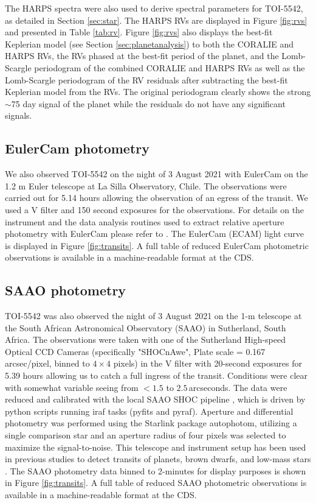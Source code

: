 \documentclass{aa}
\begin{document}
The HARPS spectra were also used to derive spectral parameters for TOI-5542, as detailed in Section \ref{sec:star}. The HARPS RVs are displayed in Figure \ref{fig:rvs} and presented in Table \ref{tab:rv}. Figure \ref{fig:rvs} also displays the best-fit Keplerian model (see Section \ref{sec:planetanalysis}) to both the CORALIE and HARPS RVs, the RVs phased at the best-fit period of the planet, and the Lomb-Scargle periodogram \citep{Lomb1976,Scargle1982} of the combined CORALIE and HARPS RVs as well as the Lomb-Scargle periodogram of the RV residuals after subtracting the best-fit Keplerian model from the RVs. The original periodogram clearly shows the strong $\sim$75 day signal of the planet while the residuals do not have any significant signals.

\subsection{EulerCam photometry}

We also observed TOI-5542 on the night of 3 August 2021 with EulerCam on the 1.2 m Euler telescope at La Silla Observatory, Chile. The observations were carried out for 5.14 hours allowing the observation of an egress of the transit. We used a V filter and 150 second exposures for the observations. For details on the instrument and the data analysis routines used to extract relative aperture photometry with EulerCam please refer to \citet{Lendl2012}. The EulerCam (ECAM) light curve is displayed in Figure \ref{fig:transits}. A full table of reduced EulerCam photometric observations is available in a machine-readable format at the CDS.

\subsection{SAAO photometry}

TOI-5542 was also observed the night of 3 August 2021 on the 1-m telescope at the South African Astronomical Observatory (SAAO) in Sutherland, South Africa. The observations were taken with one of the Sutherland High-speed Optical CCD Cameras (specifically "SHOCnAwe", Plate scale = 0.167 arcsec/pixel, binned to $4\times4$ pixels) in the V filter with 20-second exposures for 5.39 hours allowing us to catch a full ingress of the transit. Conditions were clear with somewhat variable seeing from $<1.5$ to $2.5$\,arcseconds. The data were reduced and calibrated with the local SAAO SHOC pipeline \citep{Coppejans2013}, which is driven by {\sc python} scripts running {\sc iraf} tasks ({\sc pyfits} and {\sc pyraf}). Aperture and differential photometry was performed using the {\sc Starlink} package {\sc autophotom}, utilizing a single comparison star and an aperture radius of four pixels was selected to maximize the signal-to-noise. This telescope and instrument setup has been used in previous studies to detect transits of planets, brown dwarfs, and low-mass stars \citep[e.g.,][]{Smith2021,Acton2021,Gill2022}. The SAAO photometry data binned to 2-minutes for display purposes is shown in Figure \ref{fig:transits}. A full table of reduced SAAO photometric observations is available in a machine-readable format at the CDS.
\end{document}
